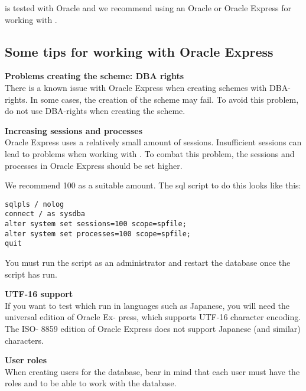 \app{} is tested with Oracle and we recommend using an Oracle or Oracle Express \gddb{} for working with \app{}. 

\subsection{Some tips for working with Oracle Express}

\textbf{Problems creating the \gddb{} scheme: DBA rights}\\

There is a known issue with Oracle Express when creating \gddb{} schemes with DBA-rights. In some cases, the creation of the \gddb{} scheme may fail.
To avoid this problem, do not use DBA-rights when creating the \gddb{} scheme.
 
\textbf{Increasing sessions and processes}\\

Oracle Express uses a relatively small amount of sessions. Insufficient sessions can lead to problems when working with \app{}. To combat this problem, the sessions and processes in Oracle Express should be set higher. 

We recommend 100 as a suitable amount. The sql script to do this looks like this:
\begin{verbatim}
sqlpls / nolog
connect / as sysdba
alter system set sessions=100 scope=spfile;
alter system set processes=100 scope=spfile;
quit
\end{verbatim}

You must run the script as an administrator and restart the
database once the script has run.


\textbf{UTF-16 support}\\
If you want to test \gdauts{} which run in languages such as
Japanese, you will need the universal edition of Oracle Ex-
press, which supports UTF-16 character encoding. The ISO-
8859 edition of Oracle Express does not support Japanese
(and similar) characters.

\textbf{User roles}\\

When creating users for the database, bear in mind that each
user must have the roles  and  to be able to
work with the database.
